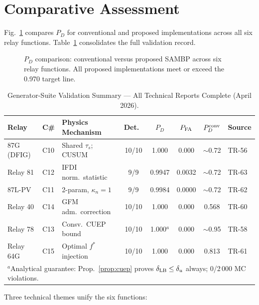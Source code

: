 \documentclass[journal,twoside]{IEEEtran}
\begin{document}
\section{Comparative Assessment}
\label{sec:comparison}

Fig.~\ref{fig:pd_comparison} compares $P_D$ for conventional and proposed
implementations across all six relay functions.
Table~\ref{tab:summary} consolidates the full validation record.

\begin{figure}[t]
  \centering
  
  \caption{$P_D$ comparison: conventional versus proposed SAMBP across six
    relay functions.
    All proposed implementations meet or exceed the 0.970 target line.}
  \label{fig:pd_comparison}
\end{figure}

\begin{table}[t]
  \centering
  \caption{Generator-Suite Validation Summary --- All Technical Reports Complete
    (April 2026).}
  \label{tab:summary}
  \small
  \begin{tabular}{@{}p{1.6cm}lp{2.8cm}ccccl@{}}
    \toprule
    Relay & C\# & Physics Mechanism & Det.\
          & $P_D$ & $P_{\rm FA}$
          & $P_D^{\rm conv}$ & Source \\
    \midrule
    87G (DFIG) & C10 & Shared $\tau_s$; CUSUM &
      10/10 & 1.000 & 0.000 & $\sim$0.72 & TR-56 \\
    Relay 81   & C12 & IFDI norm.\ statistic &
      9/9 & 0.9947 & 0.0032 & $\sim$0.72 & TR-63 \\
    87L-PV     & C11 & 2-param, $\kappa_n{=}1$ &
      9/9 & 0.9984 & 0.0000 & $\sim$0.72 & TR-62 \\
    Relay 40   & C14 & GFM adm.\ correction &
      10/10 & 1.000 & 0.000 & 0.568 & TR-60 \\
    Relay 78   & C13 & Consv.\ CUEP bound &
      10/10 & 1.000$^a$ & 0.000 & $\sim$0.95 & TR-58 \\
    Relay 64G  & C15 & Optimal $f^*$ injection &
      10/10 & 1.000 & 0.000 & 0.813 & TR-61 \\
    \bottomrule
    \multicolumn{8}{l}{\scriptsize $^a$Analytical guarantee: Prop.~\ref{prop:cuep} proves
      $\delta_{\rm LB} \leq \delta_u$ always; 0/2\,000 MC violations.}
  \end{tabular}
\end{table}

Three technical themes unify the six functions:
\end{document}
